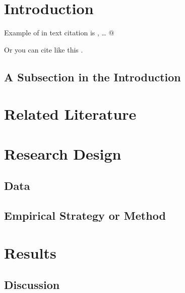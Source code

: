 \documentclass[
  11pt,
]{article}
\begin{document}
\vskip -8.5pt




\setlength{\parindent}{16pt}
\setlength{\parskip}{0pt}

\hypertarget{introduction}{%
\section{Introduction}\label{introduction}}

Example of in text citation is \citet{king2001}, \ldots{} @

Or you can cite like this \citep{king2001}.

\hypertarget{a-subsection-in-the-introduction}{%
\subsection{A Subsection in the
Introduction}\label{a-subsection-in-the-introduction}}

\hypertarget{related-literature}{%
\section{Related Literature}\label{related-literature}}

\hypertarget{research-design}{%
\section{Research Design}\label{research-design}}

\hypertarget{data}{%
\subsection{Data}\label{data}}

\hypertarget{empirical-strategy-or-method}{%
\subsection{Empirical Strategy or
Method}\label{empirical-strategy-or-method}}

\hypertarget{results}{%
\section{Results}\label{results}}

\hypertarget{discussion}{%
\subsection{Discussion}\label{discussion}}
\end{document}
